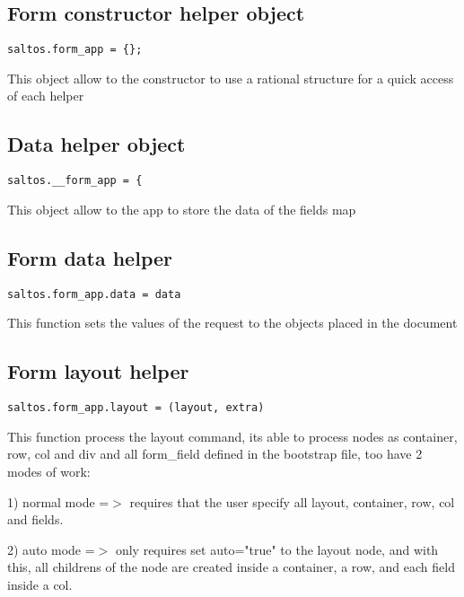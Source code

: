 \documentclass[a4paper]{book}
\begin{document}
\hypertarget{toc356}{}
\subsection{Form constructor helper object}

\begin{lstlisting}
saltos.form_app = {};
\end{lstlisting}

This object allow to the constructor to use a rational structure for a quick access of each helper

\hypertarget{toc357}{}
\subsection{Data helper object}

\begin{lstlisting}
saltos.__form_app = {
\end{lstlisting}

This object allow to the app to store the data of the fields map

\hypertarget{toc358}{}
\subsection{Form data helper}

\begin{lstlisting}
saltos.form_app.data = data
\end{lstlisting}

This function sets the values of the request to the objects placed in the document

\hypertarget{toc359}{}
\subsection{Form layout helper}

\begin{lstlisting}
saltos.form_app.layout = (layout, extra)
\end{lstlisting}

This function process the layout command, its able to process nodes as container, row, col and div
and all form\_field defined in the bootstrap file, too have 2 modes of work:

1) normal mode =$>$ requires that the user specify all layout, container, row, col and fields.

2) auto mode =$>$ only requires set auto="true" to the layout node, and with this, all childrens
of the node are created inside a container, a row, and each field inside a col.
\end{document}
